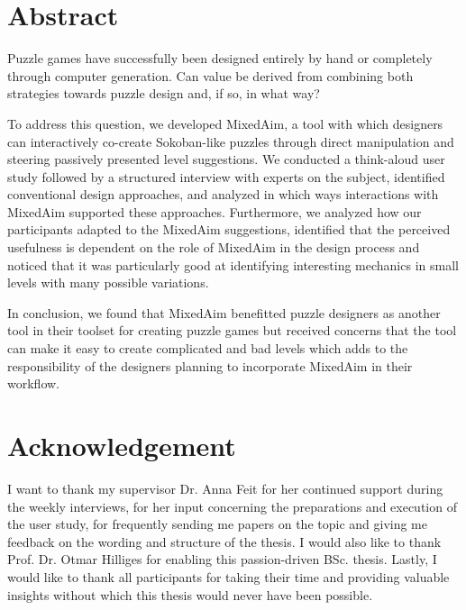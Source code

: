 
\chapter*{Abstract}

Puzzle games have successfully been designed entirely by hand or completely through computer generation. Can value be derived from combining both strategies towards puzzle design and, if so, in what way?

To address this question, we developed MixedAim, a tool with which designers can interactively co-create Sokoban-like puzzles through direct manipulation and steering passively presented level suggestions. 
We conducted a think-aloud user study followed by a structured interview with experts on the subject, identified conventional design approaches, and analyzed in which ways interactions with MixedAim supported these approaches.
Furthermore, we analyzed how our participants adapted to the MixedAim suggestions, identified that the perceived usefulness is dependent on the role of MixedAim in the design process and noticed that it was particularly good at identifying interesting mechanics in small levels with many possible variations.

In conclusion, we found that MixedAim benefitted puzzle designers as another tool in their toolset for creating puzzle games but received concerns that the tool can make it easy to create complicated and bad levels which adds to the responsibility of the designers planning to incorporate MixedAim in their workflow.


\cleardoublepage
\chapter*{Acknowledgement}

I want to thank my supervisor Dr. Anna Feit for her continued support during the weekly interviews, for her input concerning the preparations and execution of the user study, for frequently sending me papers on the topic and giving me feedback on the wording and structure of the thesis. I would also like to thank Prof. Dr. Otmar Hilliges for enabling this passion-driven BSc. thesis.   
Lastly, I would like to thank all participants for taking their time and providing valuable insights without which this thesis would never have been possible.
